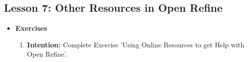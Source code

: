 \documentclass{article}
\begin{document}
\subsection{Lesson 7: Other Resources in Open Refine}

\begin{itemize}
\item{\textbf{Exercises}}

\begin{enumerate}

\item{\textbf{Intention:} Complete Exercise 'Using Online Resources to get Help with Open Refine'.}


\end{enumerate}
\end{itemize}
\end{document}
